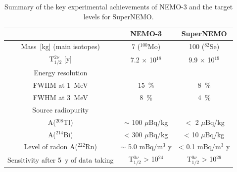\documentclass[main.tex]{subfiles}
\begin{document}
\begin{table}[h!]
\centering
\begin{tabular}{c|c|c}
\toprule
      & NEMO-3 & SuperNEMO \\
\hline
Mass~[kg] (main isotopes)           & 7 ($^{\text{100}}$Mo)         & 100 ($^{\text{82}}$Se)        \\[0.1cm]
 T$_{\text{1/2}}^{\text{2}\nu}$ [y] & 7.2 $\times$ 10$^{\text{18}}$ & 9.9 $\times$ 10$^{\text{19}}$ \\[0.1cm]
\hline
Energy resolution & & \\
FWHM at 1~MeV                       & 15~\%                         & 8~\%                          \\[0.1cm]
FWHM at 3~MeV                       & 8~\%                          & 4~\%                          \\[0.1cm]
\hline
Source radiopurity & & \\
A($^{\text{208}}$Tl)               & $\sim$ 100 $\mu$Bq/kg         & $<$ 2 $\mu$Bq/kg               \\[0.1cm]
A($^{\text{214}}$Bi)               & < 300 $\mu$Bq/kg              & < 10 $\mu$Bq/kg                \\[0.1cm]
\hline
Level of radon A($^{\text{222}}$Rn)& $\sim$ 5.0 mBq/m$^\text{3}$ y   & < 0.1 mBq/m$^\text{3}$ y     \\[0.1cm]
\hline
Sensitivity after 5~y of data taking & T$_{\text{1/2}}^{\text{0}\nu}$ > 10$^{\text{24}}$ & T$_{\text{1/2}}^{\text{0}\nu}$ > 10$^{\text{26}}$     \\[0.1cm]
\bottomrule
\end{tabular}
\caption{Summary of the key experimental achievements of NEMO-3 and the target levels for SuperNEMO.}
\label{tab:DifferenceNEMO3-SuperNEMO}
\end{table}  


\FloatBarrier
\end{document}
